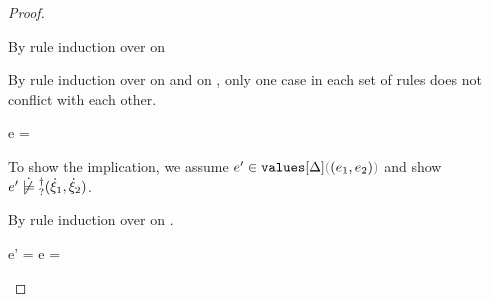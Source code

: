 \begin{proof}
\begin{byCases}
    By rule induction over  on 
    \begin{byCases}
    \item[\text{(\ref{rule:FVal})}]
      \begin{pfsteps}
      \item {}  
      \end{pfsteps}
      By rule induction over  on  and
       on , only one case in each set
      of rules does not conflict with each other.
      \begin{byCases}
      \item[\text{(\ref{rule:VPair}) and (\ref{rule:TPair})}]
        \begin{pfsteps}
        \item e =  
        \item {}  
        \item {}  
        \item {}  
        \item {}  
        \item {}  
        \item {}  
        \end{pfsteps}
        To show the implication, we assume $\inValues{e'}{\Delta}{\hpair{e_1}{e_2}}$ and show $\cnotsatisfyormay{e'}{\cpair{\hxi_1}{\hxi_2}}$.
        \begin{pfsteps}
        \item {}  
        \end{pfsteps}
        By rule induction over  on .
        \begin{byCases}

        \item[\text{(\ref{rule:IVVal})}]
          \begin{pfsteps}
          \item e' = e =  
          \item {} 
          \end{pfsteps}


\end{byCases}
\end{byCases}
\end{byCases}
\end{byCases}
\end{proof}
